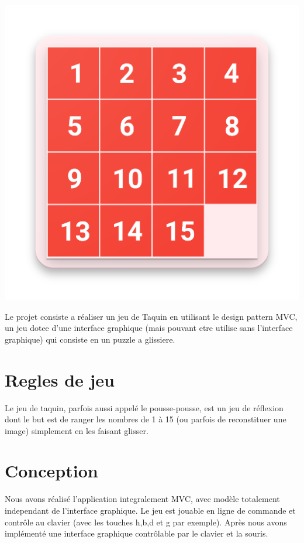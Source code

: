 \documentclass{report}
\begin{document}
\begin{center}
	\includegraphics[scale=0.2]{images/taquin.png}
\end{center}
	
	 Le projet consiste a réaliser un jeu de Taquin en utilisant le design pattern MVC, un jeu dotee d'une interface graphique (mais pouvant etre utilise sans l'interface graphique) qui consiste en un puzzle a glissiere. 
	 
	\section{Regles de jeu}
	Le jeu de taquin, parfois aussi appelé le pousse-pousse, est un jeu de réflexion dont le but est de ranger les nombres de 1 à 15 (ou parfois de reconstituer une image) simplement en les faisant glisser.

	\section{Conception}
		Nous avons réalisé l'application integralement MVC, avec modèle totalement independant de l'interface graphique. Le jeu est jouable en ligne de commande et contrôle au clavier (avec les touches h,b,d et g par exemple). Après nous avons implémenté une interface graphique contrôlable par le clavier et la souris.
\newpage		
\end{document}
